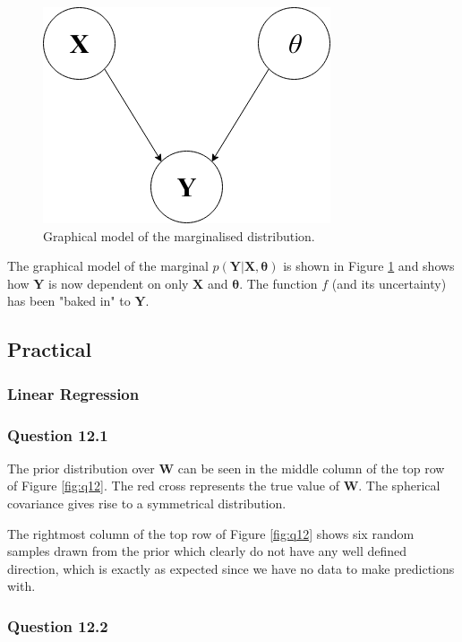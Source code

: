 \documentclass[10pt, a4paper, twocolumn]{article} %
\begin{document}
\begin{figure}[htbp]
\centerline{\includegraphics[width=0.5\linewidth]{question_11.png}}
\caption{Graphical model of the marginalised distribution.}
\label{fig:q11}
\end{figure}

The graphical model of the marginal $p(\mathbf{Y|X},\bm{\theta})$ is shown in Figure \ref{fig:q11} and shows how $\mathbf{Y}$ is now dependent on only $\mathbf{X}$ and $\bm{\theta}$.  The function $f$ (and its uncertainty) has been "baked in" to $\mathbf{Y}$.

\subsection{Practical}
\subsubsection{Linear Regression}
\subsubsection*{Question 12.1}

The prior distribution over $\mathbf{W}$ can be seen in the middle column of the top row of Figure \ref{fig:q12}. The red cross represents the true value of $\mathbf{W}$. The spherical covariance gives rise to a symmetrical distribution.

The rightmost column of the top row of Figure \ref{fig:q12} shows six random samples drawn from the prior which clearly do not have any well defined direction, which is exactly as expected since we have no data to make predictions with.

\subsubsection*{Question 12.2}
\end{document}
